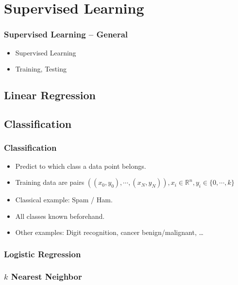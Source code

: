 \documentclass[english,final,compress]{beamer}
\begin{document}


\section{Supervised Learning}


\begin{frame}
    \frametitle{Supervised Learning -- General}
    \begin{itemize}
        \item Supervised Learning
        \item Training, Testing
    \end{itemize}
\end{frame}

\subsection{Linear Regression}



\subsection{Classification}
\begin{frame}
    \frametitle{Classification}
    \begin{itemize}
        \item Predict to which class a data point belongs.
        \item Training data are pairs $\left( (x_0, y_0), \cdots, (x_N, y_N)
                \right), x_i \in \mathbb{R}^n, y_i \in \{0, \cdots, k\}$
        \item Classical example: Spam / Ham.
        \item All classes known beforehand.
        \item Other examples: Digit recognition, cancer benign/malignant, \ldots
    \end{itemize}
\end{frame}

\subsubsection{Logistic Regression}



\subsubsection{$k$ Nearest Neighbor}


\end{document}
